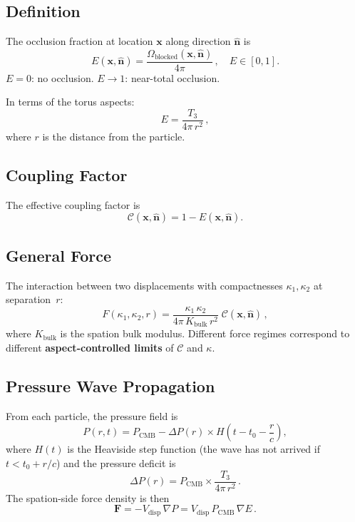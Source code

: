 \subsection{Definition}

The occlusion fraction at location $\mathbf{x}$ along direction $\hat{\mathbf{n}}$ is
\begin{equation}
  E(\mathbf{x},\hat{\mathbf{n}}) = \frac{\Omega_{\text{blocked}}(\mathbf{x},\hat{\mathbf{n}})}{4\pi}\,,
  \quad E \in [0,1].
\end{equation}
$E = 0$: no occlusion.  $E \to 1$: near-total occlusion.

In terms of the torus aspects:
\begin{equation}
  E = \frac{T_3}{4\pi\,r^2}\,,
\end{equation}
where $r$ is the distance from the particle.

\subsection{Coupling Factor}

The effective coupling factor is
\begin{equation}
  \mathcal{C}(\mathbf{x},\hat{\mathbf{n}}) = 1 - E(\mathbf{x},\hat{\mathbf{n}}).
\end{equation}

\subsection{General Force}

The interaction between two displacements with compactnesses $\kappa_1, \kappa_2$ at separation~$r$:
\begin{equation}\label{eq:force}
  F(\kappa_1, \kappa_2, r)
    = \frac{\kappa_1\,\kappa_2}{4\pi\,K_{\text{bulk}}\,r^2}\;\mathcal{C}(\mathbf{x},\hat{\mathbf{n}})\,,
\end{equation}
where $K_{\text{bulk}}$ is the spation bulk modulus.  Different force regimes correspond to different \textbf{aspect-controlled limits} of $\mathcal{C}$ and $\kappa$.

\subsection{Pressure Wave Propagation}

From each particle, the pressure field is
\begin{equation}
  P(r, t) = P_{\text{CMB}} - \Delta P(r) \times H\!\left(t - t_0 - \frac{r}{c}\right),
\end{equation}
where $H(t)$ is the Heaviside step function (the wave has not arrived if $t < t_0 + r/c$) and the pressure deficit is
\begin{equation}
  \Delta P(r) = P_{\text{CMB}} \times \frac{T_3}{4\pi\,r^2}\,.
\end{equation}
The spation-side force density is then
\begin{equation}
  \mathbf{F} = -V_{\text{disp}}\,\nabla P
    = V_{\text{disp}}\,P_{\text{CMB}}\,\nabla E\,.
\end{equation}


